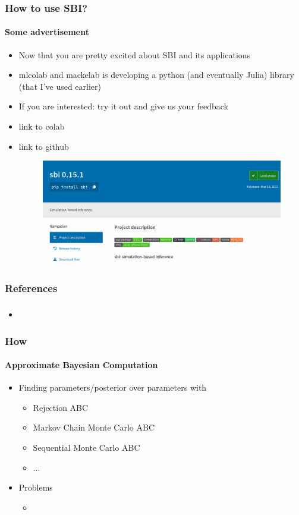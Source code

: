 \documentclass[9pt]{beamer}
\begin{document}
\begin{frame}
\frametitle{How to use SBI?}
\framesubtitle{Some advertisement}
\begin{itemize}
	\item Now that you are pretty excited about SBI and its applications
	\item mlcolab and mackelab is developing a python (and eventually Julia) library (that I've used earlier)
	\item If you are interested: try it out and give us your feedback
	\item link to colab
	\item link to github
		\begin{figure}
		\flushleft
		\includegraphics[width=.75\linewidth]{figures/sbipypi.png}
	\end{figure}
\end{itemize}
\end{frame} 


\begin{frame}
\frametitle{References}
\framesubtitle{}

\end{frame} 




\begin{frame}
\frametitle{}
\framesubtitle{}
\begin{itemize}
	\item 
\end{itemize}
\end{frame} 



\begin{frame}
\frametitle{How}
\framesubtitle{Approximate Bayesian Computation}
\begin{itemize}
	\item Finding parameters/posterior over parameters with
	\begin{itemize}
		\item Rejection ABC
		\item Markov Chain Monte Carlo ABC
		\item Sequential Monte Carlo ABC
		\item ...
	\end{itemize}
	\item Problems
	\begin{itemize}
		\item 
	\end{itemize}
\end{itemize}
\end{frame} 
\end{document}
